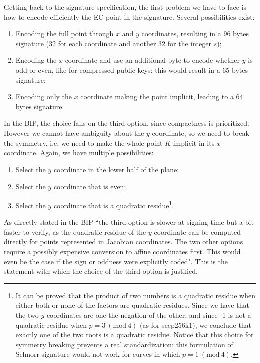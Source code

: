 \bigskip
\noindent
Getting back to the signature specification, the first problem we have to face is how to encode efficiently the EC point in the signature. Several possibilities exist:
\begin{enumerate}
	\item Encoding the full point through $x$ and $y$ coordinates, resulting in a 96 bytes signature (32 for each coordinate and another 32 for the integer $s$);
	\item Encoding the $x$ coordinate and use an additional byte to encode whether $y$ is odd or even, like for compressed public keys: this would result in a 65 bytes signature;
	\item Encoding only the $x$ coordinate making the point implicit, leading to a 64 bytes signature.
\end{enumerate}
In the BIP, the choice falls on the third option, since compactness is prioritized. However we cannot have ambiguity about the $y$ coordinate, so we need to break the symmetry, i.e. we need to make the whole point $K$ implicit in its $x$ coordinate. Again, we have multiple possibilities:
\begin{enumerate}
	\item Select the $y$ coordinate in the lower half of the plane;
	\item Select the $y$ coordinate that is even;
	\item Select the $y$ coordinate that is a quadratic residue\footnote{It can be proved that the product of two numbers is a quadratic residue when either both or none of the factors are quadratic residues. Since we have that the two $y$ coordinates are one the negation of the other, and since -1 is not a quadratic residue when $p = 3 \ (\text{mod} \ 4)$ (as for secp256k1), we conclude that exactly one of the two roots is a quadratic residue. Notice that this choice for symmetry breaking prevents a real standardization: this formulation of Schnorr signature would not work for curves in which $p = 1 \ (\text{mod} \ 4)$.}.
\end{enumerate}
As directly stated in the BIP ``the third option is slower at signing time but a bit faster to verify, as the quadratic residue of the $y$ coordinate can be computed directly for points represented in Jacobian coordinates. The two other options require a possibly expensive conversion to affine coordinates first. This would even be the case if the sign or oddness were explicitly coded". This is the statement with which the choice of the third option is justified.

